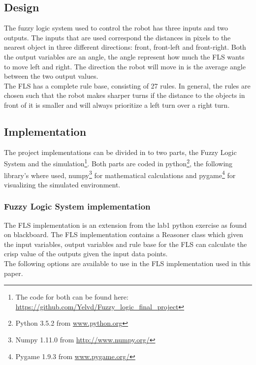 \documentclass[conference]{IEEEtran}
\begin{document}
\subsection{Design}
The fuzzy logic system used to control the robot has three inputs and two outputs. The inputs that are used correspond the distances in pixels to the nearest object in three different directions: front, front-left and front-right. Both the output variables are an angle, the angle represent how much the FLS wants to move left and right. The direction the robot will move in is the average angle between the two output values.\\
The FLS has a complete rule base, consisting of 27 rules.
In general, the rules are chosen such that the robot makes sharper turns if the distance to the objects in front of it is smaller and will always prioritize a left turn over a right turn.\\

\subsection{Implementation}
The project implementations can be divided in to two parts, the Fuzzy Logic System and the simulation\footnote{The code for both can be found here: \url{https://github.com/Yelvd/Fuzzy_logic_final_project}}. Both parts are coded in python\footnote{Python 3.5.2 from \url{www.python.org}}, the following library's where used, numpy\footnote{Numpy 1.11.0 from \url{http://www.numpy.org/}} for mathematical calculations and pygame\footnote{Pygame 1.9.3 from \url{www.pygame.org/}} for visualizing the simulated environment.\\

\subsubsection*{Fuzzy Logic System implementation}

The FLS implementation is an extension from the lab1 python exercise as found on blackboard. The FLS implementation contains a Reasoner class which given the input variables, output variables and rule base for the FLS can calculate the crisp value of the outputs given the input data points.\\
The following options are available to use in the FLS implementation used in this paper.\\
\end{document}
